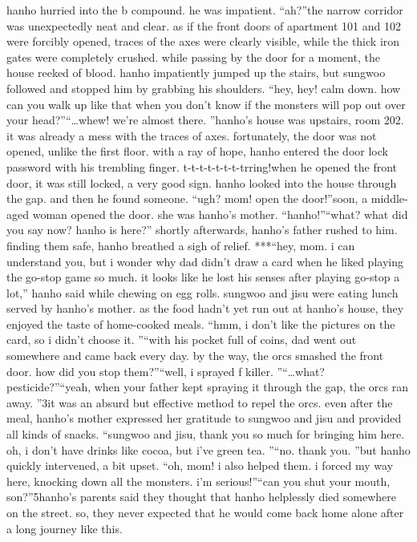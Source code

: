 hanho hurried into the b compound.
 he was impatient.
“ah?”the narrow corridor was unexpectedly neat and clear.
 as if the front doors of apartment 101 and 102 were forcibly opened, traces of the axes were clearly visible, while the thick iron gates were completely crushed.
while passing by the door for a moment, the house reeked of blood.
hanho impatiently jumped up the stairs, but sungwoo followed and stopped him by grabbing his shoulders.
“hey, hey! calm down.
 how can you walk up like that when you don’t know if the monsters will pop out over your head?”“…whew! we’re almost there.
”hanho’s house was upstairs, room 202.
 it was already a mess with the traces of axes.
fortunately, the door was not opened, unlike the first floor.
with a ray of hope, hanho entered the door lock password with his trembling finger.
t-t-t-t-t-t-t-trring!when he opened the front door, it was still locked, a very good sign.
hanho looked into the house through the gap.
 and then he found someone.
“ugh? mom! open the door!”soon, a middle-aged woman opened the door.
 she was hanho’s mother.
“hanho!”“what? what did you say now? hanho is here?”
shortly afterwards, hanho’s father rushed to him.
 finding them safe, hanho breathed a sigh of relief.
***“hey, mom.
 i can understand you, but i wonder why dad didn’t draw a card when he liked playing the go-stop game so much.
 it looks like he lost his senses after playing go-stop a lot,” hanho said while chewing on egg rolls.
sungwoo and jisu were eating lunch served by hanho’s mother.
 as the food hadn’t yet run out at hanho’s house, they enjoyed the taste of home-cooked meals.
“hmm, i don’t like the pictures on the card, so i didn’t choose it.
”“with his pocket full of coins, dad went out somewhere and came back every day.
 by the way, the orcs smashed the front door.
 how did you stop them?”“well, i sprayed f killer.
”“…what? pesticide?”“yeah, when your father kept spraying it through the gap, the orcs ran away.
”3it was an absurd but effective method to repel the orcs.
even after the meal, hanho’s mother expressed her gratitude to sungwoo and jisu and provided all kinds of snacks.
“sungwoo and jisu, thank you so much for bringing him here.
 oh, i don’t have drinks like cocoa, but i’ve green tea.
”“no.
 thank you.
”but hanho quickly intervened, a bit upset.
“oh, mom! i also helped them.
 i forced my way here, knocking down all the monsters.
 i’m serious!”“can you shut your mouth, son?”5hanho’s parents said they thought that hanho helplessly died somewhere on the street.
 so, they never expected that he would come back home alone after a long journey like this.
